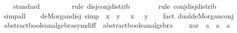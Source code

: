 \begin{isabellebody}
%
\isadelimproof
\ \ %
\endisadelimproof
%
\isatagproof
{}\isamarkupfalse%
\ standard\isanewline
\ \ \ \ \ \ \ \isamarkupfalse%
\ {\isacharparenleft}{\kern0pt}rule\ disj{\isacharunderscore}{\kern0pt}conj{\isacharunderscore}{\kern0pt}distrib{\isacharparenright}{\kern0pt}\isanewline
\ \ \ \ \ \ \isamarkupfalse%
\ {\isacharparenleft}{\kern0pt}rule\ conj{\isacharunderscore}{\kern0pt}disj{\isacharunderscore}{\kern0pt}distrib{\isacharparenright}{\kern0pt}\isanewline
\ \ \ \ \ \isamarkupfalse%
\ simp{\isacharunderscore}{\kern0pt}all\isanewline
\ \ \isamarkupfalse%
%
\endisatagproof
{\isafoldproof}%
%
\isadelimproof
\isanewline
%
\endisadelimproof
\isanewline
{}\isamarkupfalse%
\ de{\isacharunderscore}{\kern0pt}Morgan{\isacharunderscore}{\kern0pt}disj\ {\isacharbrackleft}{\kern0pt}simp{\isacharbrackright}{\kern0pt}{\isacharcolon}{\kern0pt}\ {\isachardoublequoteopen}\isactrlbold {\isacharminus}{\kern0pt}\ {\isacharparenleft}{\kern0pt}x\ \isactrlbold {\isasymsqunion}\ y{\isacharparenright}{\kern0pt}\ {\isacharequal}{\kern0pt}\ \isactrlbold {\isacharminus}{\kern0pt}\ x\ \isactrlbold {\isasymsqinter}\ \isactrlbold {\isacharminus}{\kern0pt}\ y{\isachardoublequoteclose}\isanewline
%
\isadelimproof
\ \ %
\endisadelimproof
%
\isatagproof
{}\isamarkupfalse%
\ {\isacharparenleft}{\kern0pt}fact\ dual{\isachardot}{\kern0pt}de{\isacharunderscore}{\kern0pt}Morgan{\isacharunderscore}{\kern0pt}conj{\isacharparenright}{\kern0pt}%
\endisatagproof
{\isafoldproof}%
%
\isadelimproof
\isanewline
%
\endisadelimproof
\isanewline
{}\isamarkupfalse%
\isanewline
\isanewline
{}\isamarkupfalse%
%
\isadelimdocument
%
\endisadelimdocument
%
\isatagdocument
%
\isamarkuptrue%
%
\endisatagdocument
{\isafolddocument}%
%
\isadelimdocument
%
\endisadelimdocument
{}\isamarkupfalse%
\ abstract{\isacharunderscore}{\kern0pt}boolean{\isacharunderscore}{\kern0pt}algebra{\isacharunderscore}{\kern0pt}sym{\isacharunderscore}{\kern0pt}diff\ {\isacharequal}{\kern0pt}\ abstract{\isacharunderscore}{\kern0pt}boolean{\isacharunderscore}{\kern0pt}algebra\ {\isacharplus}{\kern0pt}\isanewline
\ \ \ xor\ {\isacharcolon}{\kern0pt}{\isacharcolon}{\kern0pt}\ {\isacartoucheopen}{\isacharprime}{\kern0pt}a\ {\isasymRightarrow}\ {\isacharprime}{\kern0pt}a\ {\isasymRightarrow}\ {\isacharprime}{\kern0pt}a{\isacartoucheclose}\ \ {\isacharparenleft}{\kern0pt}\ {\isacartoucheopen}\isactrlbold {\isasymominus}{\isacartoucheclose}\ {}{}{\isacharparenright}{\kern0pt}\isanewline

\end{isabellebody}
